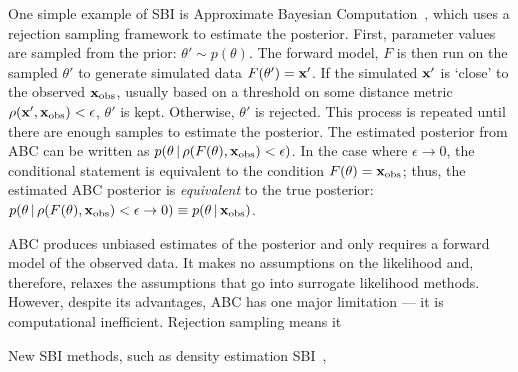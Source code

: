 One simple example of SBI is Approximate Bayesian
Computation~\citep[ABC;][]{rubin1984, pritchard1999, beaumont2002}, which uses
a rejection sampling framework to estimate the posterior. 
First, parameter values are sampled from the prior: $\theta'\sim p(\theta)$. 
The forward model, $F$ is then run on the sampled $\theta'$ to generate
simulated data $F(\theta') = {\bf x}'$.
If the simulated ${\bf x}'$ is `close' to the observed ${\bf x}_{\rm obs}$, usually based
on a threshold on some distance metric $\rho({\bf x}', {\bf x}_{\rm obs}) < \epsilon$, 
$\theta'$ is kept. 
Otherwise, $\theta'$ is rejected. 
This process is repeated until there are enough samples to estimate the
posterior. 
The estimated posterior from ABC can be written as 
$p(\theta \,|\, \rho(F(\theta), {\bf x}_{\rm obs}) < \epsilon)$. 
In the case where $\epsilon\rightarrow 0$, the conditional statement is
equivalent to the condition $F(\theta) = {\bf x}_{\rm obs}$; thus, the estimated ABC
posterior is {\em equivalent} to the true posterior:
$p(\theta \,|\, \rho(F(\theta), {\bf x}_{\rm obs}) < \epsilon\rightarrow 0) \equiv
p(\theta \,|\, {\bf x}_{\rm obs})$.

ABC produces unbiased estimates of the posterior and only requires a forward
model of the observed data.
It makes no assumptions on the likelihood and, therefore, relaxes the
assumptions that go into surrogate likelihood methods. 
However, despite its advantages, ABC has one major limitation --- it is
computational inefficient. 
Rejection sampling means it 


New SBI methods, such as density estimation SBI~\citep[\eg][]{papamakarios2017,
alsing2018, hahn2019c, greenberg2019, tejero-cantero2020},

